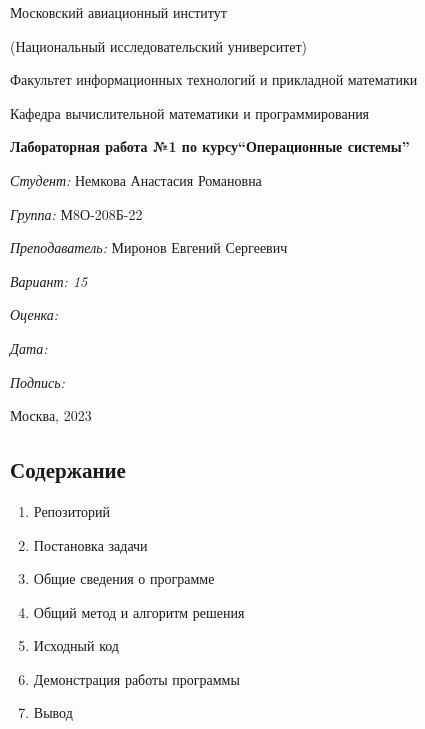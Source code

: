 \documentclass[a4paper, 14pt]{article}
\begin{document}
\thispagestyle{empty}	
\begin{center}
	Московский авиационный институт
	
	(Национальный исследовательский университет)
	
	Факультет информационных технологий и прикладной математики
	
	Кафедра вычислительной математики и программирования
	
\end{center}
\vspace{40ex}
\begin{center}
	\textbf{\large{Лабораторная работа №1 по курсу\linebreak \textquotedblleft Операционные системы\textquotedblright}}
\end{center}
\vspace{35ex}
\begin{flushright}
	\textit{Студент: } Немкова Анастасия Романовна
	
	\vspace{2ex}
	\textit{Группа: } М8О-208Б-22
	
	\vspace{2ex}
	\textit{Преподаватель: } Миронов Евгений Сергеевич
	
	\vspace{2ex}
	\textit{Вариант: 15} 
	
	\vspace{2ex}
	\textit{Оценка: } \underline{\quad\quad\quad\quad\quad\quad}
	
	 \vspace{2ex}
	\textit{Дата: } \underline{\quad\quad\quad\quad\quad\quad}
	
	\vspace{2ex}
	\textit{Подпись: } \underline{\quad\quad\quad\quad\quad\quad}
	
\end{flushright}

\vspace{5ex}

\begin{vfill}
	\begin{center}
		Москва, 2023
	\end{center}	
\end{vfill}
\newpage

\begin{center}
\section*{Содержание}   
\end{center}
\vspace{5ex}
\begin{enumerate}
  \item Репозиторий
  \item Постановка задачи
  \item Общие сведения о программе
  \item Общий метод и алгоритм решения
  \item Исходный код
  \item Демонстрация работы программы
  \item Вывод
\end{enumerate}
\newpage
\end{document}
